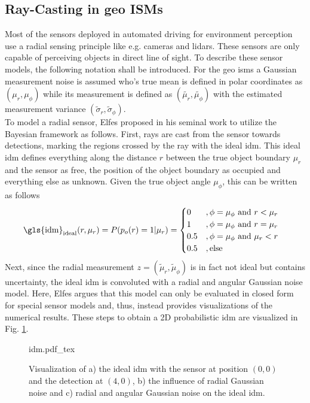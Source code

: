 \subsection{Ray-Casting in geo ISMs}
\label{subsec:ray_casting}
Most of the sensors deployed in automated driving for environment perception use a radial sensing principle like e.g. cameras and lidars. These sensors are only capable of perceiving objects in direct line of sight. To describe these sensor models, the following notation shall be introduced. For the geo \gls{ism}s a Gaussian measurement noise is assumed who's true mean is defined in polar coordinates as $(\mu_r, \mu_\phi)$ while its measurement is defined as $(\tilde{\mu_r}, \tilde{\mu_\phi})$ with the estimated measurement variance $(\tilde{\sigma}_r, \tilde{\sigma}_\phi)$.
\\
To model a radial sensor, Elfes \cite{elfes1989using} proposed in his seminal work to utilize the Bayesian framework as follows. First, rays are cast from the sensor towards detections, marking the regions crossed by the ray with the ideal \gls{idm}. This ideal \gls{idm} defines everything along the distance $r$ between the true object boundary $\mu_r$ and the sensor as free, the position of the object boundary as occupied and everything else as unknown. Given the true object angle $\mu_{\phi}$,  this can be written as follows 
\begin{align}
	\label{eq:ideal_idm}
	\text{\gls{idm}}_{\text{ideal}}(r,\mu_r) = P(p_o(r) = 1 |\mu_r) &= 
	\begin{cases}
		0 &, \phi = \mu_{\phi} \text{ and } r < \mu_r\\
		1 &, \phi = \mu_{\phi} \text{ and }r = \mu_r\\
		0.5 &, \phi = \mu_{\phi} \text{ and } \mu_r < r\\				
		0.5 &, \text{else}		
	\end{cases}
\end{align}
Next, since the radial measurement $z = (\tilde{\mu}_r, \tilde{\mu}_{\phi})$ is in fact not ideal but contains uncertainty, the ideal \gls{idm} is convoluted with a radial and angular Gaussian noise model. Here, Elfes argues that this model can only be evaluated in closed form for special sensor models and, thus, instead provides visualizations of the numerical results. These steps to obtain a 2D probabilistic \gls{idm} are visualized in Fig. \ref{fig:idm}.
\begin{figure}
	\begin{center}
		{idm.pdf_tex}
		\caption{\label{fig:idm} Visualization of a) the ideal \gls{idm} with the sensor at position $(0,0)$ and the detection at $(4,0)$, b) the influence of radial Gaussian noise and c) radial and angular Gaussian noise on the ideal \gls{idm}.}
	\end{center}
\end{figure}  
